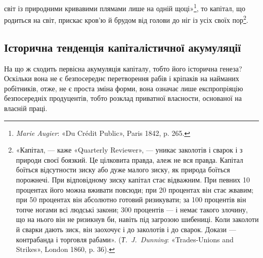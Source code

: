світ із природними кривавими плямами лише на одній щоці»\footnote{
\emph{Marie Augier}: «Du Crédit Public», Paris 1842, p. 265.
},
то капітал, що родиться на світ, прискає кров’ю й брудом від
голови до ніг із усіх своїх пор\footnote{
«Капітал, — каже «Quarterly Reviewer», — уникає заколотів
і сварок і з природи своєї боязкий. Це цілковита правда, алеж не вся
правда. Капітал боїться відсутности зиску або дуже малого зиску, як
природа боїться порожнечі. При відповідному зиску капітал стає відважним.
При певних 10 процентах його можна вживати повсюди; при 20 процентах
він стає жвавим; при 50 процентах він абсолютно готовий ризикувати;
за 100 процентів він топче ногами всі людські закони; 300 процентів
— і немає такого злочину, що на нього він не ризикнув би, навіть
під загрозою шибениці. Коли заколоти й сварки дають зиск, він заохочує
і до заколотів і до сварок. Докази — контрабанда і торговля рабами».
(\emph{Т.~J.~Dunning}: «Trades-Unions and Strikes», London 1860, p. 36).
}.

\subsection{Історична тенденція капіталістичної акумуляції}

На що ж сходить первісна акумуляція капіталу, тобто його
історична генеза? Оскільки вона не є безпосереднє перетворення
рабів і кріпаків на найманих робітників, отже, не є проста
зміна форми, вона означає лише експропріяцію безпосередніх
продуцентів, тобто розклад приватної власности, основаної на
власній праці.
